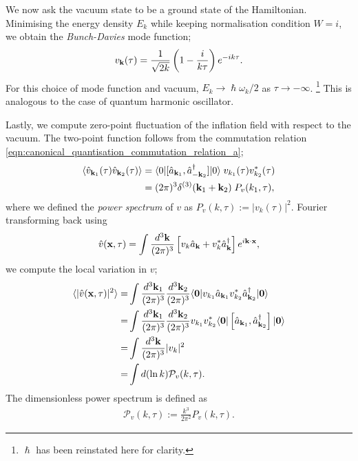 We now ask the vacuum state to be a ground state of the Hamiltonian. Minimising the energy density $E_k$ while keeping normalisation condition $W=i$, we obtain the \textit{Bunch-Davies} mode function;
\begin{align}
	v_\mathbf{k}(\tau) = \frac{1}{\sqrt{2k}} \left( 1 - \frac{i}{k\tau} \right) e^{-ik\tau}. \label{eqn:bunch_davis_mode_function}
\end{align}
For this choice of mode function and vacuum, $E_k \rightarrow \hslash\omega_k/2$ as $\tau \rightarrow -\infty$. \footnote{$\hslash$ has been reinstated here for clarity.} This is analogous to the case of quantum harmonic oscillator.

Lastly, we compute zero-point fluctuation of the inflation field with respect to the vacuum. The two-point function follows from the commutation relation \eqref{eqn:canonical_quantisation_commutation_relation_a};
\begin{align}
	\langle \hat{v}_{\mathbf{k}_1} (\tau) \hat{v}_{\mathbf{k}_2} (\tau) \rangle &= \langle 0| [\hat{a}_{\mathbf{k}_1}, \hat{a}^\dagger_{-\mathbf{k}_2}] |0 \rangle \; v_{k_1}(\tau) v^*_{k_2}(\tau) \\
	&= (2\pi)^3 \delta^{(3)} (\mathbf{k}_1 + \mathbf{k}_2 ) \; P_{v}(k_1,\tau),   \label{eqn:single_field_inflation_power_spectrum}
\end{align}
where we defined the \textit{power spectrum} of $v$ as $P_v(k,\tau) := |v_k(\tau)|^2$. Fourier transforming back using
\begin{align}
	\hat{v}(\mathbf{x}, \tau) = \int \frac{d^3\mathbf{k}}{(2\pi)^3} \left[ v_k \hat{a}_\mathbf{k} + v^*_k \hat{a}^\dagger_\mathbf{k} \right] e^{i\mathbf{k} \cdot \mathbf{x}},
\end{align}
we compute the local variation in $v$;
\begin{align}
	\langle | \hat{v}(\mathbf{x}, \tau) |^2 \rangle =& \int \frac{d^3\mathbf{k}_1}{(2\pi)^3} \frac{d^3\mathbf{k}_2}{(2\pi)^3} \langle \mathbf{0} | v_{k_1} \hat{a}_{\mathbf{k}_1} v^*_{k_2} \hat{a}^\dagger_{\mathbf{k}_2} | \mathbf{0} \rangle 	\\
	=& \int \frac{d^3\mathbf{k}_1}{(2\pi)^3} \frac{d^3\mathbf{k}_2}{(2\pi)^3} v_{k_1} v^*_{k_2} \langle \mathbf{0} | \left[ \hat{a}_{\mathbf{k}_1}, \hat{a}^\dagger_{\mathbf{k}_2} \right] | \mathbf{0} \rangle	 \\
	=& \int \frac{d^3\mathbf{k}}{(2\pi)^3} |v_k|^2	\\
	=& \int d(\ln k) \mathcal{P}_v (k,\tau).
\end{align}
The dimensionless power spectrum is defined as
\begin{align}
	\mathcal{P}_v (k,\tau) := \frac{k^3}{2\pi^2} P_v(k,\tau).
\end{align}
